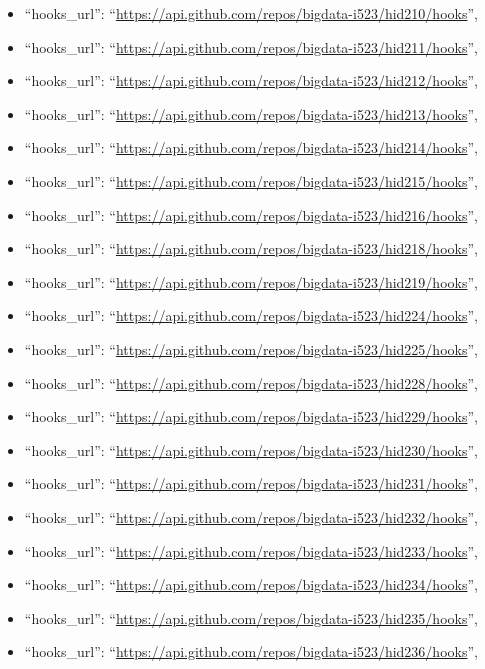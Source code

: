\begin{itemize}
\item
  ``hooks\_url'':
  ``\url{https://api.github.com/repos/bigdata-i523/hid210/hooks}'',
\item
  ``hooks\_url'':
  ``\url{https://api.github.com/repos/bigdata-i523/hid211/hooks}'',
\item
  ``hooks\_url'':
  ``\url{https://api.github.com/repos/bigdata-i523/hid212/hooks}'',
\item
  ``hooks\_url'':
  ``\url{https://api.github.com/repos/bigdata-i523/hid213/hooks}'',
\item
  ``hooks\_url'':
  ``\url{https://api.github.com/repos/bigdata-i523/hid214/hooks}'',
\item
  ``hooks\_url'':
  ``\url{https://api.github.com/repos/bigdata-i523/hid215/hooks}'',
\item
  ``hooks\_url'':
  ``\url{https://api.github.com/repos/bigdata-i523/hid216/hooks}'',
\item
  ``hooks\_url'':
  ``\url{https://api.github.com/repos/bigdata-i523/hid218/hooks}'',
\item
  ``hooks\_url'':
  ``\url{https://api.github.com/repos/bigdata-i523/hid219/hooks}'',
\item
  ``hooks\_url'':
  ``\url{https://api.github.com/repos/bigdata-i523/hid224/hooks}'',
\item
  ``hooks\_url'':
  ``\url{https://api.github.com/repos/bigdata-i523/hid225/hooks}'',
\item
  ``hooks\_url'':
  ``\url{https://api.github.com/repos/bigdata-i523/hid228/hooks}'',
\item
  ``hooks\_url'':
  ``\url{https://api.github.com/repos/bigdata-i523/hid229/hooks}'',
\item
  ``hooks\_url'':
  ``\url{https://api.github.com/repos/bigdata-i523/hid230/hooks}'',
\item
  ``hooks\_url'':
  ``\url{https://api.github.com/repos/bigdata-i523/hid231/hooks}'',
\item
  ``hooks\_url'':
  ``\url{https://api.github.com/repos/bigdata-i523/hid232/hooks}'',
\item
  ``hooks\_url'':
  ``\url{https://api.github.com/repos/bigdata-i523/hid233/hooks}'',
\item
  ``hooks\_url'':
  ``\url{https://api.github.com/repos/bigdata-i523/hid234/hooks}'',
\item
  ``hooks\_url'':
  ``\url{https://api.github.com/repos/bigdata-i523/hid235/hooks}'',
\item
  ``hooks\_url'':
  ``\url{https://api.github.com/repos/bigdata-i523/hid236/hooks}'',

\end{itemize}
